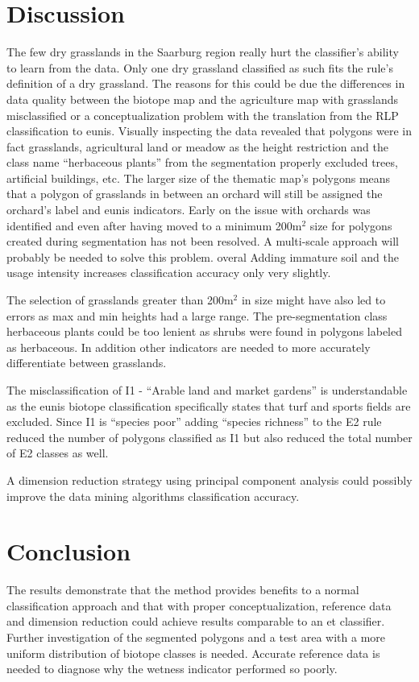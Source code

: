 \documentclass[authoryear,preprint,12pt,number]{elsarticle}
\begin{document}
\section{Discussion}
The few dry grasslands in the Saarburg region really hurt the classifier's 
ability to learn from the data. Only one dry grassland classified as such fits 
the rule's definition of a dry grassland. The reasons for this could be due the 
differences in data quality between the biotope map and the agriculture map 
with grasslands misclassified or a conceptualization problem with the 
translation from the RLP classification to \gls{eunis}. Visually inspecting the 
data revealed that polygons were in fact grasslands, agricultural land or 
meadow as the height restriction and the class name ``herbaceous plants'' from 
the segmentation properly excluded trees, artificial buildings, etc. The larger 
size of the thematic map's polygons means that a polygon of grasslands in 
between an orchard will still be assigned the orchard's label and \gls{eunis} 
indicators. Early on the issue with orchards was identified and even after 
having moved to a minimum 200m$^{2}$ size for polygons created during 
segmentation has not been resolved. A multi-scale approach will probably be 
needed to solve this problem. overal Adding immature soil and the usage 
intensity increases classification accuracy only very slightly.

The selection of grasslands greater than 200m$^{2}$ in size might have also led
to errors as max and min heights had a large range. The pre-segmentation class
herbaceous plants could be too lenient as shrubs were found in polygons labeled
as herbaceous. In addition other indicators are needed to more accurately
differentiate between grasslands.

The misclassification of I1 - ``Arable land and market gardens'' is 
understandable as the \gls{eunis} biotope classification specifically states 
that 
turf and sports fields are excluded. Since I1 is ``species poor'' adding 
``species richness'' to the E2 rule reduced the number of polygons classified 
as I1 but also reduced the total number of E2 classes as well.

A dimension reduction strategy using principal component analysis could possibly
improve the data mining algorithms classification accuracy.
\section{Conclusion}
The results demonstrate that the method provides benefits to a normal
classification approach and that with proper conceptualization, reference data
and dimension reduction could achieve results comparable to an \gls{et} 
classifier.
Further investigation of the segmented polygons and a test area with a more
uniform distribution of biotope classes is needed. Accurate reference data is
needed to diagnose why the wetness indicator performed so poorly.
\end{document}

